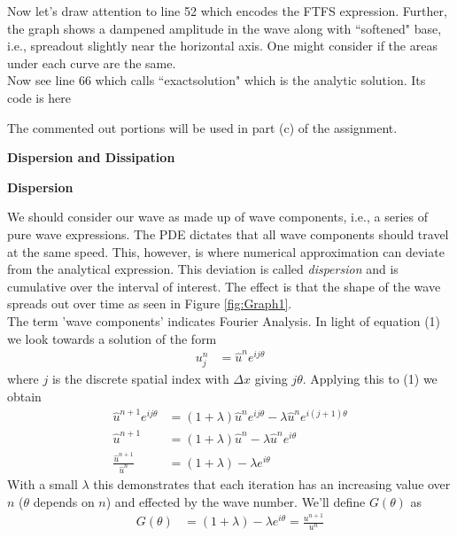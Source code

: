 \documentclass[12pt,a4paper]{report}
\begin{document}
\begin{description}
Now let's draw attention to line 52 which encodes the FTFS expression.  Further, the graph shows a dampened amplitude in the wave along with ``softened" base, i.e., spreadout slightly near the horizontal axis.  One might consider if the areas under each curve are the same.\\

Now see line 66 which calls ``exactsolution" which is the analytic solution.  Its code is here


The commented out portions will be used in part (c) of the assignment.
	
	\item \textbf{Dispersion and Dissipation}
	\begin{description}
		\item \textbf{Dispersion}
		
		We should consider our wave as made up of wave components, i.e., a series of pure wave expressions.  The PDE dictates that all wave components should travel at the same speed.  This, however, is where numerical approximation can deviate from the analytical expression.  This deviation is called \textit{dispersion} and is cumulative over the interval of interest.  The effect is that the shape of the wave spreads out over time as seen in Figure \ref{fig:Graph1}.  \\
		
		The term 'wave components' indicates Fourier Analysis.  In light of equation (1) we look towards a solution of the form
		\begin{align*}
			u_j^n &= \hat{u}^ne^{ij\theta}
		\end{align*}where $j$ is the discrete spatial index with $\Delta x$ giving $j\theta$.  Applying this to (1) we obtain 
		\begin{align*}
			\hat{u}^{n+1}e^{ij\theta} &= (1+\lambda)\hat{u}^ne^{ij\theta}-\lambda \hat{u}^ne^{i(j+1)\theta} \\
			\hat{u}^{n+1} &= (1+\lambda)\hat{u}^n-\lambda \hat{u}^ne^{i\theta} \\
			\frac{\hat{u}^{n+1}}{\hat{u}^n} &= (1+\lambda)-\lambda e^{i\theta}
		\end{align*}With a small $\lambda$ this demonstrates that each iteration has an increasing value over $n$ ($\theta$ depends on $n$) and effected by the wave number.  We'll define $G(\theta)$ as 
		\begin{align*}
			G(\theta) &= (1+\lambda)-\lambda e^{i\theta} = \frac{u^{n+1}}{u^n} 
		\end{align*}
		

\end{description}
\end{description}
\end{document}
